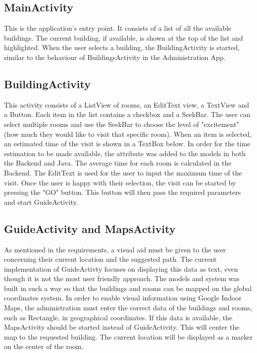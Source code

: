 \subsection{MainActivity}
This is the application's entry point. It consists of a list of all the available buildings. The current building, if available, is shown at the top of the list and highlighted.  
When the user selects a building, the BuildingActivity is started, similar to the behaviour of BuildingsActivity in the Administration App.
\subsection{BuildingActivity}
This activity consists of a ListView of rooms, an EditText view, a TextView and a Button. Each item in the list contains a checkbox and a SeekBar. The user can select multiple rooms and use the SeekBar to choose the level of "excitement" (how much they would like to visit that specific room). When an item is selected, an estimated time of the visit is shown in a TextBox below. In order for the time estimation to be made available, the attribute was added to the models in both the Backend and Java. The average time for each room is calculated in the Backend. The EditText is used for the user to input the maximum time of the visit. Once the user is happy with their selection, the visit can be started by pressing the "GO" button. This button will then pass the required parameters and start GuideActivity.
\subsection{GuideActivity and MapsActivity}
As mentioned in the requirements, a visual aid must be given to the user concerning their current location and the suggested path. The current implementation of GuideActivty focuses on displaying this data as text, even though it is not the most user friendly approach. The models and system was built in such a way so that the buildings and rooms can be mapped on the global coordinates system. In order to enable visual information using Google Indoor Maps, the administration must enter the correct data of the buildings and rooms, such as Rectangle, in geographical coordinates. If this data is available, the MapsActivity should be started instead of GuideActivity. This will center the map to the requested building. The current location will be displayed as a marker on the center of the room.


